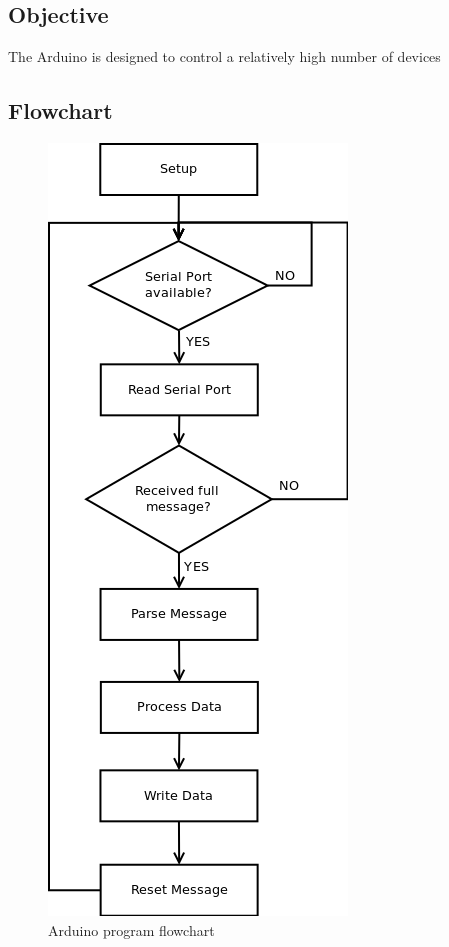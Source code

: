 \subsection{Objective}
The Arduino is designed to control a relatively high number of devices 




\newpage
\subsection{Flowchart}
	\begin{figure}[H]
			\centering
			\includegraphics[scale=0.75]{images/Diagrams/arduino.png}
			\caption{Arduino program flowchart }
			\label{}
	\end{figure}
	\bigskip